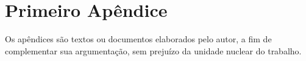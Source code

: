 \chapter{Primeiro Apêndice}

Os apêndices são textos ou documentos elaborados pelo autor, a fim de complementar sua argumentação, sem prejuízo da unidade nuclear do trabalho.